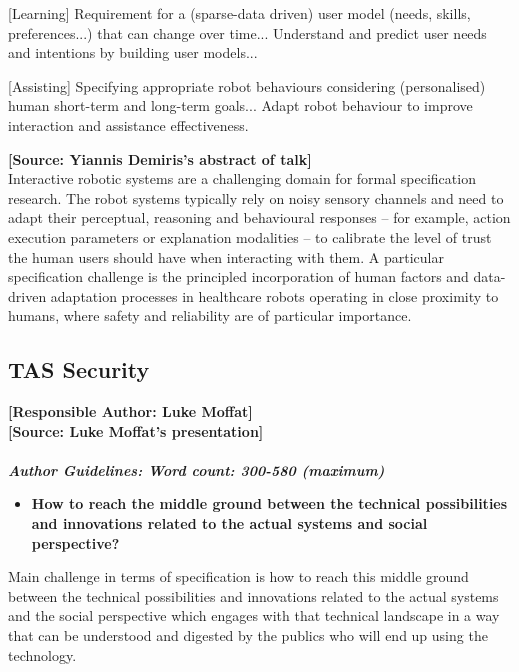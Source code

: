 \documentclass[sigconf]{acmart}
\begin{document}
[Learning] Requirement for a (sparse-data driven) user model (needs, skills, preferences...) that can change over time... Understand and predict user needs and intentions by building user models...

[Assisting] Specifying appropriate robot behaviours considering (personalised) human short-term and long-term goals...
Adapt robot behaviour to improve interaction and assistance effectiveness.

\noindent \textbf{[Source: Yiannis Demiris's abstract of talk]}\\
Interactive robotic systems are a challenging domain for formal specification research. The robot systems typically rely on noisy sensory channels and need to adapt their perceptual, reasoning and behavioural responses – for example, action execution parameters or explanation modalities – to calibrate the level of trust the human users should have when interacting with them. A particular specification challenge is the principled incorporation of human factors and data-driven adaptation processes in healthcare robots operating in close proximity to humans, where safety and reliability are of particular importance. 

\subsection{TAS Security}
\noindent\textbf{[Responsible Author:  Luke Moffat]}\\
\noindent\textbf{[Source: Luke Moffat's presentation]}\\\\
\noindent\textbf{\textit{Author Guidelines: Word count: 300-580 (maximum)}}\\
\begin{itemize}
	\item \textbf{How to reach the middle ground between the technical possibilities and innovations related to the actual systems and social perspective?}
\end{itemize}
Main challenge in terms of specification is how to reach this middle ground between the technical possibilities and innovations related to the actual systems and the social perspective which engages with that technical landscape in a way that can be understood and digested by the publics who will end up using the technology. 
\end{document}
